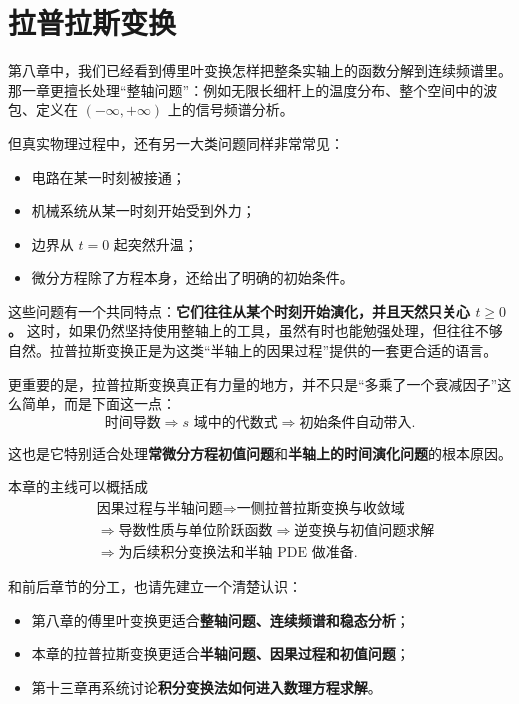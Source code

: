 
\chapter{拉普拉斯变换}

\begin{wulibj}[本章导读]
第八章中，我们已经看到傅里叶变换怎样把整条实轴上的函数分解到连续频谱里。那一章更擅长处理``整轴问题''：例如无限长细杆上的温度分布、整个空间中的波包、定义在 $(-\infty,+\infty)$ 上的信号频谱分析。

但真实物理过程中，还有另一大类问题同样非常常见：
\begin{itemize}
    \item 电路在某一时刻被接通；
    \item 机械系统从某一时刻开始受到外力；
    \item 边界从 $t=0$ 起突然升温；
    \item 微分方程除了方程本身，还给出了明确的初始条件。
\end{itemize}

这些问题有一个共同特点：\textbf{它们往往从某个时刻开始演化，并且天然只关心 $t\ge 0$。} 这时，如果仍然坚持使用整轴上的工具，虽然有时也能勉强处理，但往往不够自然。拉普拉斯变换正是为这类``半轴上的因果过程''提供的一套更合适的语言。

更重要的是，拉普拉斯变换真正有力量的地方，并不只是``多乘了一个衰减因子''这么简单，而是下面这一点：
\[
    \text{时间导数}
    \Longrightarrow
    \text{$s$ 域中的代数式}
    \Longrightarrow
    \text{初始条件自动带入}.
\]

这也是它特别适合处理\textbf{常微分方程初值问题}和\textbf{半轴上的时间演化问题}的根本原因。

本章的主线可以概括成
\begin{equation}
    \begin{aligned}
        &\text{因果过程与半轴问题}
        \Longrightarrow
        \text{一侧拉普拉斯变换与收敛域} \\
        &\Longrightarrow
        \text{导数性质与单位阶跃函数}
        \Longrightarrow
        \text{逆变换与初值问题求解} \\
        &\Longrightarrow
        \text{为后续积分变换法和半轴 PDE 做准备}.
    \end{aligned}
\end{equation}

和前后章节的分工，也请先建立一个清楚认识：
\begin{itemize}
    \item 第八章的傅里叶变换更适合\textbf{整轴问题、连续频谱和稳态分析}；
    \item 本章的拉普拉斯变换更适合\textbf{半轴问题、因果过程和初值问题}；
    \item 第十三章再系统讨论\textbf{积分变换法如何进入数理方程求解}。
\end{itemize}
\end{wulibj}

